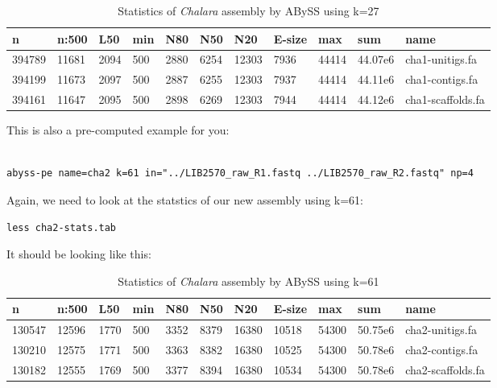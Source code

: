 \begin{table}[H]
  \centering
  \caption{Statistics of \textit{Chalara} assembly by ABySS using k=27}
    \begin{tabular}{lllllllllll}
    \toprule
    \textbf{n} & \textbf{n:500} & \textbf{L50} & \textbf{min} & \textbf{N80}& \textbf{N50}& \textbf{N20}& \textbf{E-size}& \textbf{max} & \textbf{sum}& \textbf{name}\\
    \midrule
    394789  & 11681  & 2094  & 500  & 2880  & 6254  & 12303  & 7936    & 44414  & 44.07e6  & cha1-unitigs.fa \\
    394199  & 11673  & 2097  & 500  & 2887  & 6255  & 12303  & 7937    & 44414  & 44.11e6  & cha1-contigs.fa \\
    394161  & 11647  & 2095  & 500  & 2898  & 6269  & 12303  & 7944    & 44414  & 44.12e6  & cha1-scaffolds.fa \\
    \bottomrule
    \end{tabular}
  \label{tab:chak27}
\end{table}


\begin{warning}
This is also a pre-computed example for you:
\begin{lstlisting}

abyss-pe name=cha2 k=61 in="../LIB2570_raw_R1.fastq ../LIB2570_raw_R2.fastq" np=4
\end{lstlisting}
\end{warning}

\begin{steps}
Again, we need to look at the statstics of our new assembly using k=61:
\begin{lstlisting}
less cha2-stats.tab
\end{lstlisting}
\end{steps}

It should be looking like this:
\begin{table}[H]
  \centering
  \caption{Statistics of \textit{Chalara} assembly by ABySS using k=61}
    \begin{tabular}{lllllllllll}
    \toprule
    \textbf{n} & \textbf{n:500} & \textbf{L50} & \textbf{min} & \textbf{N80}& \textbf{N50}& \textbf{N20}& \textbf{E-size}& \textbf{max} & \textbf{sum}& \textbf{name}\\
    \midrule
    130547  & 12596  & 1770  & 500  & 3352  & 8379  & 16380  & 10518   & 54300  & 50.75e6  & cha2-unitigs.fa \\
    130210  & 12575  & 1771  & 500  & 3363  & 8382  & 16380  & 10525   & 54300  & 50.78e6  & cha2-contigs.fa \\
    130182  & 12555  & 1769  & 500  & 3377  & 8394  & 16380  & 10534   & 54300  & 50.78e6  & cha2-scaffolds.fa \\
    \bottomrule
    \end{tabular}
  \label{tab:chak61}
\end{table}

